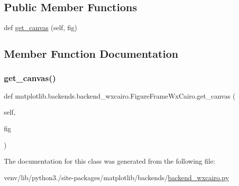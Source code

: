 \subsection*{Public Member Functions}
\begin{DoxyCompactItemize}
\item 
def \hyperlink{classmatplotlib_1_1backends_1_1backend__wxcairo_1_1FigureFrameWxCairo_adf85be1d9d1f1e8c85479d9f20083051}{get\+\_\+canvas} (self, fig)
\end{DoxyCompactItemize}


\subsection{Member Function Documentation}
\mbox{\label{classmatplotlib_1_1backends_1_1backend__wxcairo_1_1FigureFrameWxCairo_adf85be1d9d1f1e8c85479d9f20083051}} 
\subsubsection{\texorpdfstring{get\+\_\+canvas()}{get\_canvas()}}
{\footnotesize\ttfamily def matplotlib.\+backends.\+backend\+\_\+wxcairo.\+Figure\+Frame\+Wx\+Cairo.\+get\+\_\+canvas (\begin{DoxyParamCaption}\item[{}]{self,  }\item[{}]{fig }\end{DoxyParamCaption})}



The documentation for this class was generated from the following file\+:\begin{DoxyCompactItemize}
\item 
venv/lib/python3./site-\/packages/matplotlib/backends/\hyperlink{backend__wxcairo_8py}{backend\+\_\+wxcairo.\+py}\end{DoxyCompactItemize}
